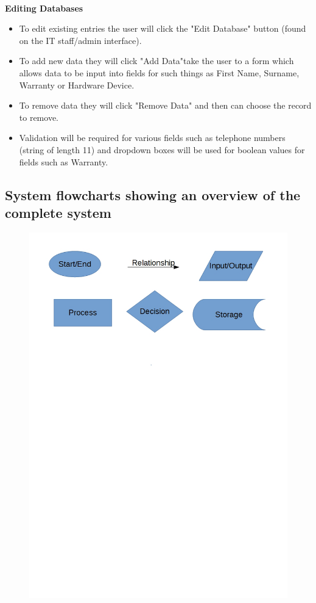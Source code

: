 \

\textbf{Editing Databases}
\begin{itemize}
\item To edit existing entries the user will click the "Edit Database" button (found on the IT staff/admin interface).
\item To add new data they will click "Add Data"take the user to a form which allows data to be input into fields for such things as First Name, Surname, Warranty or Hardware Device.
\item To remove data they will click "Remove Data" and then can choose the record to remove.
\item Validation will be required for various fields such as telephone numbers (string of length 11) and dropdown boxes will be used for boolean values for fields such as Warranty.
\end{itemize}


\subsection{System flowcharts showing an overview of the complete system}

\begin{figure}[H]
\includegraphics[width=.9\textwidth,height=.9\textheight,keepaspectratio]{FlowchartKey.jpg}
\end{figure}

